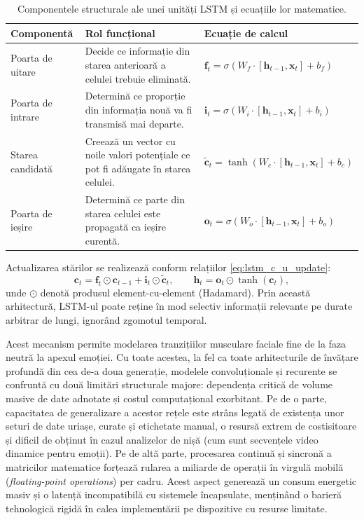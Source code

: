 \begin{table}[htbp]
	\centering
	\caption{Componentele structurale ale unei unități LSTM și ecuațiile lor matematice.}
	\label{tab:lstm_components}
	\small
	\begin{tabular}{@{} l p{6.5cm} l @{}}
		\hline
		\textbf{Componentă} & \textbf{Rol funcțional} & \textbf{Ecuație de calcul} \\ \hline
		\rule{0pt}{3ex}Poarta de uitare & Decide ce informație din starea anterioară a celulei trebuie eliminată. & $\displaystyle \mathbf{f}_t = \sigma\left(W_f \cdot [\mathbf{h}_{t-1}, \mathbf{x}_t] + b_f\right)$ \\[1.5ex]
		Poarta de intrare & Determină ce proporție din informația nouă va fi transmisă mai departe. & $\displaystyle \mathbf{i}_t = \sigma\left(W_i \cdot [\mathbf{h}_{t-1}, \mathbf{x}_t] + b_i\right)$ \\[1.5ex]
		Starea candidată & Creează un vector cu noile valori potențiale ce pot fi adăugate în starea celulei. & $\displaystyle \tilde{\mathbf{c}}_t = \tanh\left(W_c \cdot [\mathbf{h}_{t-1}, \mathbf{x}_t] + b_c\right)$ \\[1.5ex]
		Poarta de ieșire & Determină ce parte din starea celulei este propagată ca ieșire curentă. & $\displaystyle \mathbf{o}_t = \sigma\left(W_o \cdot [\mathbf{h}_{t-1}, \mathbf{x}_t] + b_o\right)$ \\[1ex] \hline
	\end{tabular}
\end{table}

Actualizarea stărilor se realizează conform relațiilor \eqref{eq:lstm_c_u_update}:
\begin{equation}
	\label{eq:lstm_c_u_update}
	\mathbf{c}_t = \mathbf{f}_t \odot \mathbf{c}_{t-1} + \mathbf{i}_t \odot \tilde{\mathbf{c}}_t, \qquad \mathbf{h}_t = \mathbf{o}_t \odot \tanh(\mathbf{c}_t),
\end{equation}
unde $\odot$ denotă produsul element-cu-element (Hadamard). Prin această arhitectură, LSTM-ul poate reține în mod selectiv informații relevante pe durate arbitrar de lungi, ignorând zgomotul temporal.

Acest mecanism permite modelarea tranzițiilor musculare faciale fine de la faza neutră la apexul emoției. Cu toate acestea, la fel ca toate arhitecturile de învățare profundă din cea de-a doua generație, modelele convoluționale și recurente se confruntă cu două limitări structurale majore: dependența critică de volume masive de date adnotate și costul computațional exorbitant. Pe de o parte, capacitatea de generalizare a acestor rețele este strâns legată de existența unor seturi de date uriașe, curate și etichetate manual, o resursă extrem de costisitoare și dificil de obținut în cazul analizelor de nișă (cum sunt secvențele video dinamice pentru emoții). Pe de altă parte, procesarea continuă și sincronă a matricilor matematice forțează rularea a miliarde de operații în virgulă mobilă (\textit{floating-point operations}) per cadru. Acest aspect generează un consum energetic masiv și o latență incompatibilă cu sistemele încapsulate, menținând o barieră tehnologică rigidă în calea implementării pe dispozitive cu resurse limitate.

